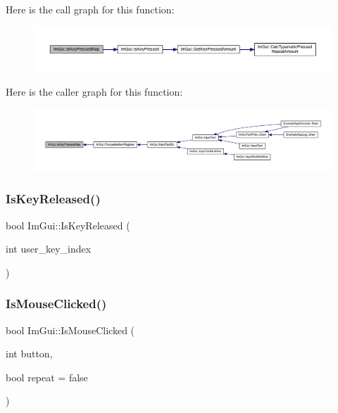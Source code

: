 Here is the call graph for this function\+:
\nopagebreak
\begin{figure}[H]
\begin{center}
\leavevmode
\includegraphics[width=350pt]{namespace_im_gui_aa4c4806c81aef3abe125b209f19d4a2b_cgraph}
\end{center}
\end{figure}
Here is the caller graph for this function\+:
\nopagebreak
\begin{figure}[H]
\begin{center}
\leavevmode
\includegraphics[width=350pt]{namespace_im_gui_aa4c4806c81aef3abe125b209f19d4a2b_icgraph}
\end{center}
\end{figure}
\mbox{\label{namespace_im_gui_a3fb25247181c5c292fe4f932bd20de88}} 
\subsubsection{\texorpdfstring{Is\+Key\+Released()}{IsKeyReleased()}}
{\footnotesize\ttfamily bool Im\+Gui\+::\+Is\+Key\+Released (\begin{DoxyParamCaption}\item[{int}]{user\+\_\+key\+\_\+index }\end{DoxyParamCaption})}

\mbox{\label{namespace_im_gui_a22b689cf4cf519590c2e2ad4f5462f29}} 
\subsubsection{\texorpdfstring{Is\+Mouse\+Clicked()}{IsMouseClicked()}}
{\footnotesize\ttfamily bool Im\+Gui\+::\+Is\+Mouse\+Clicked (\begin{DoxyParamCaption}\item[{int}]{button,  }\item[{bool}]{repeat = {\ttfamily false} }\end{DoxyParamCaption})}

